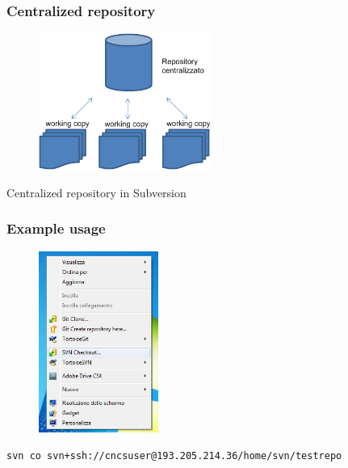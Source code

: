 \documentclass[10pt]{beamer}
\begin{document}
\begin{frame}[fragile]
\frametitle{Centralized repository}
\begin{figure}[h]
 \centering
 \includegraphics[width=0.5\textwidth]{images/svn-schema.png}
\end{figure}
Centralized repository in Subversion
\end{frame}
\begin{frame}[fragile]
\frametitle{Example usage}
\begin{figure}[h]
 \centering
 \includegraphics[width=0.35\textwidth]{images/image1.png}
\end{figure}
\begin{verbatim}
svn co svn+ssh://cncsuser@193.205.214.36/home/svn/testrepo 
\end{verbatim}
\end{frame}
\end{document}
